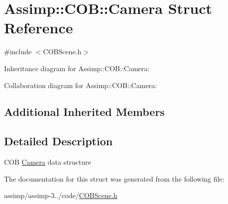 \hypertarget{struct_assimp_1_1_c_o_b_1_1_camera}{\section{Assimp\+:\+:C\+O\+B\+:\+:Camera Struct Reference}
\label{struct_assimp_1_1_c_o_b_1_1_camera}
}


{\ttfamily \#include $<$C\+O\+B\+Scene.\+h$>$}



Inheritance diagram for Assimp\+:\+:C\+O\+B\+:\+:Camera\+:


Collaboration diagram for Assimp\+:\+:C\+O\+B\+:\+:Camera\+:
\subsection*{Additional Inherited Members}


\subsection{Detailed Description}
C\+O\+B \hyperlink{struct_assimp_1_1_c_o_b_1_1_camera}{Camera} data structure 

The documentation for this struct was generated from the following file\+:\begin{DoxyCompactItemize}
\item 
assimp/assimp-\/3../code/\hyperlink{_c_o_b_scene_8h}{C\+O\+B\+Scene.\+h}\end{DoxyCompactItemize}
